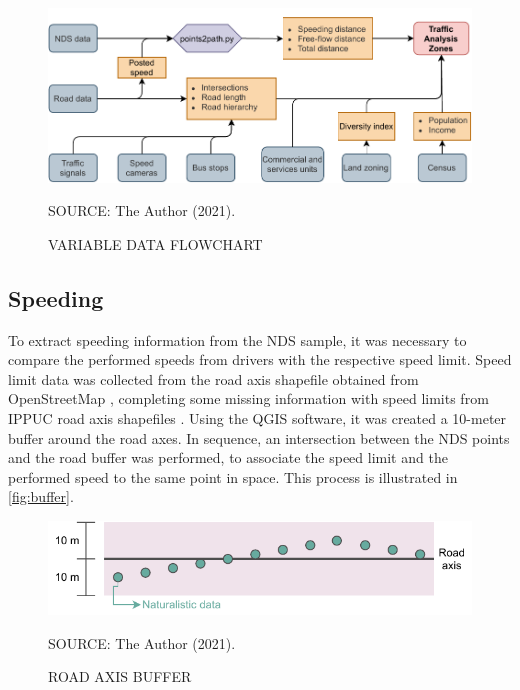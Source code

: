 \begin{figure}[!htbp]
    \centering\footnotesize
    \captionsetup{font=footnotesize}
    \caption{VARIABLE DATA FLOWCHART}
    \includegraphics{fig/methods.pdf}
    \label{fig:methods}
    \par SOURCE: The Author (2021).
\end{figure}

\subsection{Speeding} \label{sub:spd}





To extract speeding information from the NDS sample, it was necessary to compare the performed speeds from drivers with the respective speed limit. Speed limit data was collected from the road axis shapefile obtained from OpenStreetMap \cite{OpenStreetMap}, completing some missing information with speed limits from IPPUC road axis shapefiles \cite{IPPUC2021}. Using the QGIS software, it was created a 10-meter buffer around the road axes. In sequence, an intersection between the NDS points and the road buffer was performed, to associate the speed limit and the performed speed to the same point in space. This process is illustrated in \autoref{fig:buffer}. 

\begin{figure}[!htbp]
    \centering\footnotesize
    \captionsetup{font=footnotesize}
    \caption{ROAD AXIS BUFFER}
    \includegraphics{fig/buffer.pdf}
    \label{fig:buffer}
    \par SOURCE: The Author (2021).
\end{figure}

